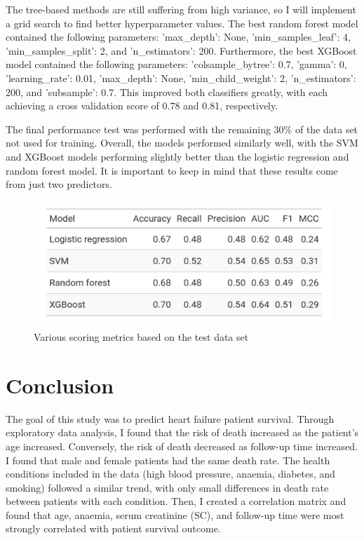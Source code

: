 \documentclass[12pt, letterpaper]{article}
\begin{document}
	The tree-based methods are still suffering from high variance, so I will implement a grid search to find better hyperparameter values. The best random forest model contained the following parameters: 'max\_depth': None, 'min\_samples\_leaf': 4, 'min\_samples\_split': 2, and 'n\_estimators': 200. Furthermore, the best XGBoost model contained the following parameters: 'colsample\_bytree': 0.7, 'gamma': 0, 'learning\_rate': 0.01, 'max\_depth': None, 'min\_child\_weight': 2, 'n\_estimators': 200, and 'subsample': 0.7. This improved both classifiers greatly, with each achieving a cross validation score of 0.78 and 0.81, respectively.
	
	The final performance test was performed with the remaining 30\% of the data set not used for training. Overall, the models performed similarly well, with the SVM and XGBoost models performing slightly better than the logistic regression and random forest model. It is important to keep in mind that these results come from just two predictors.
	
	\begin{figure}[H]
		\centering
		\includegraphics[width=0.9\linewidth]{figs/final_test.png}
		\caption{Various scoring metrics based on the test data set}
		\label{fig:final_test}
	\end{figure}
	
	\section{Conclusion}
	
	The goal of this study was to predict heart failure patient survival. Through exploratory data analysis, I found that the risk of death increased as the patient's age increased. Conversely, the risk of death decreased as follow-up time increased. I found that male and female patients had the same death rate. The health conditions included in the data (high blood pressure, anaemia, diabetes, and smoking) followed a similar trend, with only small differences in death rate between patients with each condition. Then, I created a correlation matrix and found that age, anaemia, serum creatinine (SC), and follow-up time were most strongly correlated with patient survival outcome.
	
\end{document}
